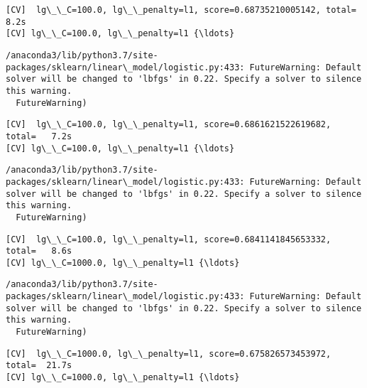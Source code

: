 \documentclass[11pt]{article}
\begin{document}
    \begin{Verbatim}[commandchars=\\\{\}]
[CV]  lg\_\_C=100.0, lg\_\_penalty=l1, score=0.68735210005142, total=   8.2s
[CV] lg\_\_C=100.0, lg\_\_penalty=l1 {\ldots}

    \end{Verbatim}

    \begin{Verbatim}[commandchars=\\\{\}]
/anaconda3/lib/python3.7/site-packages/sklearn/linear\_model/logistic.py:433: FutureWarning: Default solver will be changed to 'lbfgs' in 0.22. Specify a solver to silence this warning.
  FutureWarning)

    \end{Verbatim}

    \begin{Verbatim}[commandchars=\\\{\}]
[CV]  lg\_\_C=100.0, lg\_\_penalty=l1, score=0.6861621522619682, total=   7.2s
[CV] lg\_\_C=100.0, lg\_\_penalty=l1 {\ldots}

    \end{Verbatim}

    \begin{Verbatim}[commandchars=\\\{\}]
/anaconda3/lib/python3.7/site-packages/sklearn/linear\_model/logistic.py:433: FutureWarning: Default solver will be changed to 'lbfgs' in 0.22. Specify a solver to silence this warning.
  FutureWarning)

    \end{Verbatim}

    \begin{Verbatim}[commandchars=\\\{\}]
[CV]  lg\_\_C=100.0, lg\_\_penalty=l1, score=0.6841141845653332, total=   8.6s
[CV] lg\_\_C=1000.0, lg\_\_penalty=l1 {\ldots}

    \end{Verbatim}

    \begin{Verbatim}[commandchars=\\\{\}]
/anaconda3/lib/python3.7/site-packages/sklearn/linear\_model/logistic.py:433: FutureWarning: Default solver will be changed to 'lbfgs' in 0.22. Specify a solver to silence this warning.
  FutureWarning)

    \end{Verbatim}

    \begin{Verbatim}[commandchars=\\\{\}]
[CV]  lg\_\_C=1000.0, lg\_\_penalty=l1, score=0.675826573453972, total=  21.7s
[CV] lg\_\_C=1000.0, lg\_\_penalty=l1 {\ldots}

    \end{Verbatim}
\end{document}
